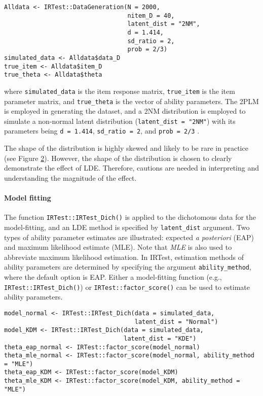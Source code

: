 \begin{verbatim}
Alldata <- IRTest::DataGeneration(N = 2000,
                                  nitem_D = 40,
                                  latent_dist = "2NM",
                                  d = 1.414,
                                  sd_ratio = 2,
                                  prob = 2/3)
simulated_data <- Alldata$data_D
true_item <- Alldata$item_D
true_theta <- Alldata$theta
\end{verbatim}

where \texttt{simulated\_data} is the item response matrix, \texttt{true\_item} is the
item parameter matrix, and \texttt{true\_theta} is the vector of ability
parameters. The 2PLM is employed in generating the dataset, and a 2NM
distribution is employed to simulate a non-normal latent distribution
(\texttt{latent\_dist~=~"2NM"}) with its parameters being \texttt{d~=~1.414},
\texttt{sd\_ratio~=~2}, and \texttt{prob~=~2/3} \citep[for the reparameterization of the 2NM,
see][]{Li:2021, IRTest}.

The shape of the distribution is highly skewed and likely to be rare in
practice (see Figure
\protect\hyperlink{fig:estimated-density-latex}{2}). However, the shape of the
distribution is chosen to clearly demonstrate the effect of LDE.
Therefore, cautions are needed in interpreting and understanding the
magnitude of the effect.

\hypertarget{model-fitting}{%
\paragraph{Model fitting}\label{model-fitting}}

The function \texttt{IRTest::IRTest\_Dich()} is applied to the dichotomous data
for the model-fitting, and an LDE method is specified by \texttt{latent\_dist}
argument. Two types of ability parameter estimates are illustrated:
expected \emph{a posteriori} (EAP) and maximum likelihood estimate (MLE).
Note that \emph{MLE} is also used to abbreviate maximum likelihood
estimation. In IRTest, estimation methods of ability parameters are
determined by specifying the argument \texttt{ability\_method}, where the
default option is EAP. Either a model-fitting function (e.g.,
\texttt{IRTest::IRTest\_Dich()}) or \texttt{IRTest::factor\_score()} can be used to
estimate ability parameters.

\begin{verbatim}
model_normal <- IRTest::IRTest_Dich(data = simulated_data,
                                    latent_dist = "Normal")
model_KDM <- IRTest::IRTest_Dich(data = simulated_data,
                                 latent_dist = "KDE")
theta_eap_normal <- IRTest::factor_score(model_normal)
theta_mle_normal <- IRTest::factor_score(model_normal, ability_method = "MLE")
theta_eap_KDM <- IRTest::factor_score(model_KDM)
theta_mle_KDM <- IRTest::factor_score(model_KDM, ability_method = "MLE")
\end{verbatim}

